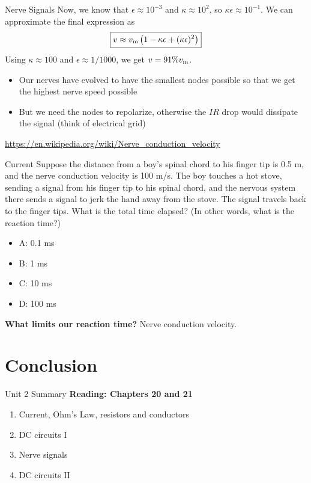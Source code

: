 \documentclass{beamer}
\begin{document}
\begin{frame}{Nerve Signals}
Now, we know that $\epsilon \approx 10^{-3}$ and $\kappa \approx 10^2$, so $\kappa\epsilon \approx 10^{-1}$.  We can approximate the final expression as
\begin{equation}
\boxed{
v \approx v_{\rm m} \left( 1-\kappa\epsilon + (\kappa\epsilon)^2 \right)
}
\end{equation}
Using $\kappa \approx 100$ and $\epsilon \approx 1/1000$, we get $v = 91\% v_{\rm m}$.
\begin{itemize}
\item Our nerves have evolved to have the smallest nodes possible so that we get the highest nerve speed possible
\item But we need the nodes to repolarize, otherwise the $IR$ drop would dissipate the signal (think of electrical grid)
\end{itemize}
\url{https://en.wikipedia.org/wiki/Nerve_conduction_velocity}
\end{frame}

\begin{frame}{Current}
Suppose the distance from a boy's spinal chord to his finger tip is 0.5 m, and the nerve conduction velocity is 100 m/s.  The boy touches a hot stove, sending a signal from his finger tip to his spinal chord, and the nervous system there sends a signal to jerk the hand away from the stove.  The signal travels back to the finger tips.  What is the total time elapsed?  (In other words, what is the reaction time?)
\begin{itemize}
\item A: 0.1 ms
\item B: 1 ms
\item C: 10 ms
\item D: 100 ms
\end{itemize}
\textbf{What limits our reaction time?} Nerve conduction velocity.
\end{frame}

\section{Conclusion}

\begin{frame}{Unit 2 Summary}
\textbf{Reading: Chapters 20 and 21}
\begin{enumerate}
\item Current, Ohm's Law, resistors and conductors
\item DC circuits I
\item Nerve signals
\item \alert{DC circuits II}
\end{enumerate}
\end{frame}
\end{document}
